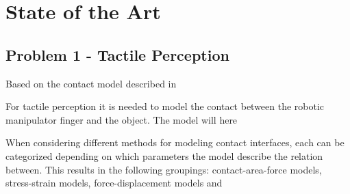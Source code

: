 
\chapter{State of the Art} \label{ch:state-of-the-art}

\section{Problem 1 - Tactile Perception} \label{sec:lit-rev-problem-1}

Based on the contact model described in 







For tactile perception it is needed to model the contact between the robotic manipulator finger and the object. The model will here 





%  




When considering different methods for modeling contact interfaces, each can be categorized depending on which parameters the model describe the relation between. This results in the following groupings: contact-area-force models, stress-strain models, force-displacement models and 













